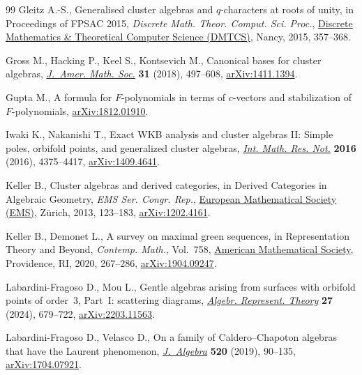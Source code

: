 \begin{thebibliography}{99}
Gleitz A.-S., Generalised cluster algebras and {$q$}-characters at roots of
  unity, in Proceedings of {FPSAC} 2015, \textit{Discrete Math. Theor. Comput. Sci. Proc.}, \href{https://doi.org/10.46298/dmtcs.2479}{Discrete Mathematics \& Theoretical Computer Science (DMTCS)}, Nancy,
  2015, 357--368.

Gross M., Hacking P., Keel S., Kontsevich M., Canonical bases for cluster
  algebras,  \href{https://doi.org/10.1090/jams/890}{\textit{J.~Amer. Math. Soc.}} \textbf{31} (2018), 497--608,
  \href{https://arxiv.org/abs/1411.1394}{arXiv:1411.1394}.

Gupta M., A formula for {$F$}-polynomials in terms of $c$-vectors and
  stabilization of {$F$}-polynomials, \href{https://arxiv.org/abs/1812.01910}{arXiv:1812.01910}.

Iwaki K., Nakanishi T., Exact {WKB} analysis and cluster algebras {II}:
  {S}imple poles, orbifold points, and generalized cluster algebras,
  \href{https://doi.org/10.1093/imrn/rnv270}{\textit{Int. Math. Res. Not.}} \textbf{2016} (2016), 4375--4417,
  \href{https://arxiv.org/abs/1409.4641}{arXiv:1409.4641}.

Keller B., Cluster algebras and derived categories, in Derived {C}ategories in
  {A}lgebraic {G}eometry, \textit{EMS Ser. Congr. Rep.},  \href{https://doi.org/10.4171/115-1/6}{European Mathematical Society (EMS)}, Z\"urich, 2013, 123--183, \href{https://arxiv.org/abs/1202.4161}{arXiv:1202.4161}.

Keller B., Demonet L., A survey on maximal green sequences, in Representation
  {T}heory and {B}eyond, \textit{Contemp. Math.}, Vol.~758, \href{https://doi.org/10.1090/conm/758/15239}{American
  Mathematical Society}, Providence, RI, 2020, 267--286, \href{https://arxiv.org/abs/1904.09247}{arXiv:1904.09247}.

Labardini-Fragoso D., Mou L., Gentle algebras arising from surfaces with
  orbifold points of order~3, Part~{I}: scattering diagrams, \href{https://doi.org/10.1007/s10468-023-10233-x}{\textit{Algebr.
  Represent. Theory}} \textbf{27} (2024), 679--722, \href{https://arxiv.org/abs/2203.11563}{arXiv:2203.11563}.

Labardini-Fragoso D., Velasco D., On a family of {C}aldero--{C}hapoton algebras
  that have the {L}aurent phenomenon, \href{https://doi.org/10.1016/j.jalgebra.2018.11.012}{\textit{J.~Algebra}} \textbf{520} (2019),
  90--135, \href{https://arxiv.org/abs/1704.07921}{arXiv:1704.07921}.


\end{thebibliography}
